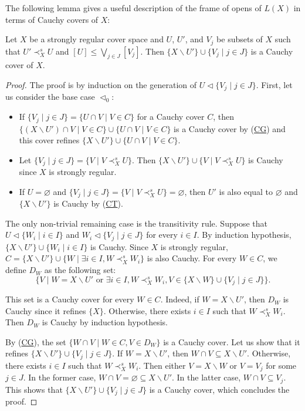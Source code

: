 \documentclass[reqno]{amsart}
\newcommand{\axref}[1]{(\hyperref[ax:#1]{#1})}
\theoremstyle{definition}
\theoremstyle{remark}
\numberwithin{figure}{section}
\newcommand{\rb}{\prec}
\begin{document}
The following lemma gives a useful description of the frame of opens of $L(X)$ in terms of Cauchy covers of $X$:

\begin{lem}
Let $X$ be a strongly regular cover space and $U$, $U'$, and $V_j$ be subsets of $X$ such that $U' \rb^s_X U$ and $[U] \leq \bigvee_{j \in J} [V_j]$.
Then $\{ X \backslash U'\} \cup \{ V_j \mid j \in J \}$ is a Cauchy cover of $X$.
\end{lem}
\begin{proof}
The proof is by induction on the generation of $U \triangleleft \{ V_j \mid j \in J \}$.
First, let us consider the base case $\triangleleft_0$:
\begin{itemize}
\item If $\{ V_j \mid j \in J \} = \{ U \cap V \mid V \in C \}$ for a Cauchy cover $C$, then $\{ (X \backslash U') \cap V \mid V \in C \} \cup \{ U \cap V \mid V \in C \}$ is a Cauchy cover by \axref{CG} and this cover refines $\{ X \backslash U' \} \cup \{ U \cap V \mid V \in C \}$.
\item Let $\{ V_j \mid j \in J \} = \{ V \mid V \rb^s_X U \}$. Then $\{ X \backslash U' \} \cup \{ V \mid V \rb^s_X U \}$ is Cauchy since $X$ is strongly regular.
\item If $U = \varnothing$ and $\{ V_j \mid j \in J \} = \{ V \mid V \rb^s_X U \} = \varnothing$, then $U'$ is also equal to $\varnothing$ and $\{ X \backslash U' \}$ is Cauchy by \axref{CT}.
\end{itemize}
The only non-trivial remaining case is the transitivity rule.
Suppose that $U \triangleleft \{ W_i \mid i \in I \}$ and $W_i \triangleleft \{ V_j \mid j \in J \}$ for every $i \in I$.
By induction hypothesis, $\{ X \backslash U'\} \cup \{ W_i \mid i \in I \}$ is Cauchy.
Since $X$ is strongly regular, $C = \{ X \backslash U'\} \cup \{ W \mid \exists i \in I, W \rb^s_X W_i \}$ is also Cauchy.
For every $W \in C$, we define $D_W$ as the following set:
\[ \{ V \mid W = X \backslash U' \textrm{ or } \exists i \in I, W \rb^s_X W_i, V \in \{ X \backslash W \} \cup \{ V_j \mid j \in J \} \}. \]

This set is a Cauchy cover for every $W \in C$.
Indeed, if $W = X \backslash U'$, then $D_W$ is Cauchy since it refines $\{ X \}$.
Otherwise, there exists $i \in I$ such that $W \rb^s_X W_i$.
Then $D_W$ is Cauchy by induction hypothesis.

By \axref{CG}, the set $\{ W \cap V \mid W \in C, V \in D_W \}$ is a Cauchy cover.
Let us show that it refines $\{ X \backslash U'\} \cup \{ V_j \mid j \in J \}$.
If $W = X \backslash U'$, then $W \cap V \subseteq X \backslash U'$.
Otherwise, there exists $i \in I$ such that $W \rb^s_X W_i$.
Then either $V = X \backslash W$ or $V = V_j$ for some $j \in J$.
In the former case, $W \cap V = \varnothing \subseteq X \backslash U'$.
In the latter case, $W \cap V \subseteq V_j$.
This shows that $\{ X \backslash U'\} \cup \{ V_j \mid j \in J \}$ is a Cauchy cover, which concludes the proof.
\end{proof}
\end{document}
